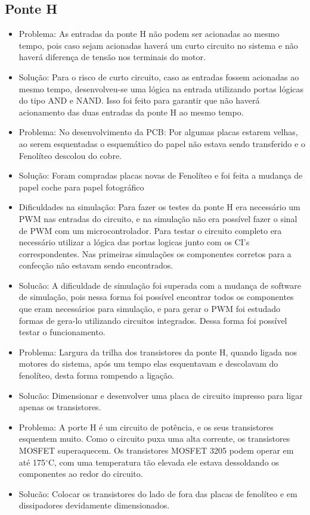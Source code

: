 \subsection{Ponte H}
 \begin{itemize}
    \item Problema: As entradas da ponte H não podem ser acionadas ao mesmo tempo, pois caso sejam acionadas haverá um curto circuito no sistema e não haverá diferença de tensão nos terminais do motor.
    \item Solução: Para o risco de curto circuito, caso as entradas fossem acionadas ao mesmo tempo, desenvolveu-se uma lógica na entrada utilizando portas lógicas do tipo AND e NAND. Isso foi feito para garantir que não haverá acionamento das duas entradas da ponte H ao mesmo tempo.

    \item Problema: No desenvolvimento da PCB: Por algumas placas estarem velhas, ao serem esquentadas o esquemático do papel não estava sendo transferido e o Fenolíteo descolou do cobre.
    \item Solução: Foram compradas placas novas de Fenolíteo e foi feita a mudança de papel coche para papel fotográfico

    \item Dificuldades na simulação: Para fazer os testes da ponte H era necessário um PWM nas entradas do circuito, e na simulação não era possível fazer o sinal de PWM com um microcontrolador. Para testar o circuito completo era necessário utilizar a lógica das portas logicas junto com os CI’s correspondentes. Nas primeiras simulações os componentes corretos para a confecção não estavam sendo encontrados.
    \item Solucão: A dificuldade de simulação foi superada com a mudança de software de simulação, pois nessa forma foi possível encontrar todos os componentes que eram necessários para simulação, e para gerar o PWM foi estudado formas de gera-lo utilizando circuitos integrados. Dessa forma foi possível testar o funcionamento.

	\item Problema: Largura da trilha dos transistores da ponte H, quando ligada nos motores do sistema, após um tempo elas esquentavam e descolavam do fenolíteo, desta forma rompendo a ligação.
    \item Solucão: Dimensionar e desenvolver uma placa de circuito impresso para ligar apenas os transistores.

    \item Problema: A porte H é um circuito de potência, e os seus transistores esquentem muito. Como o circuito puxa uma alta corrente, os transistores MOSFET superaquecem. Os transistores MOSFET 3205 podem operar em até 175$^{\circ}$C, com uma temperatura tão elevada ele estava dessoldando os componentes ao redor do circuito.
	\item Solucão: Colocar os transistores do lado de fora das placas de fenolíteo e em dissipadores devidamente dimensionados.

    \end{itemize}

